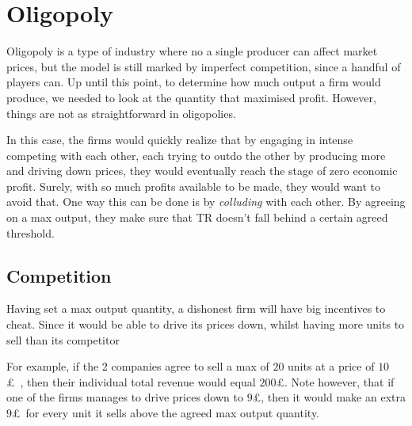 \documentclass[english,course]{Notes}
\newcommand{\ita}[1]{\textit{#1}}
\begin{document}
\section{Oligopoly}


\par{Oligopoly is a type of industry where no a single producer can affect market prices, but the model is still marked by imperfect competition, since a handful of players can. Up until this point, to determine how much output a firm would produce, we needed to look at the quantity that maximised profit. However, things are not as straightforward in oligopolies.}




\par{In this case, the firms would quickly realize that by engaging in intense competing with each other, each trying to outdo the other by producing more and driving down prices, they would eventually reach the stage of zero economic profit. Surely, with so much profits available to be made, they would want to avoid that. One way this can be done is by \ita{colluding} with each other. By agreeing on a max output, they make sure that TR doesn't fall behind a certain agreed threshold. }

\subsection{Competition}

\par{Having set a max output quantity, a dishonest firm will have big incentives to cheat. Since it would be able to drive its prices down, whilst having more units to sell than its competitor}

\par{For example, if the 2 companies agree to sell a max of $20$ units at a price of $10$\pounds \ , then their individual total revenue would equal $200$\pounds. Note however, that if one of the firms manages to drive prices down to $9$\pounds, then it would make an extra $9$\pounds \ for every unit it sells above the agreed max output quantity.}
\end{document}
